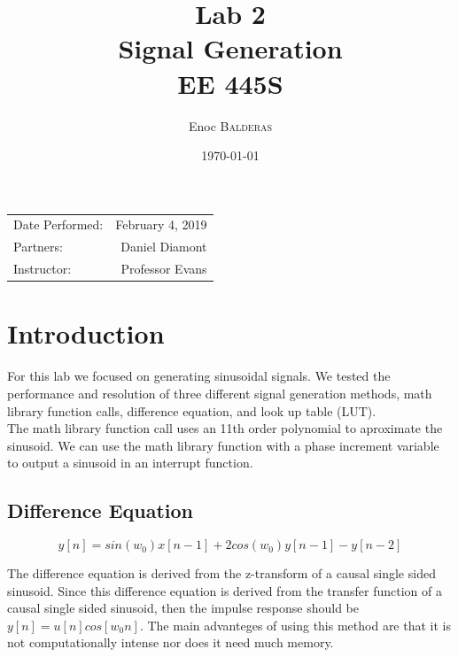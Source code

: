 \documentclass{article}
\title{Lab 2\\ Signal Generation\\ EE 445S} %
\author{Enoc \textsc{Balderas}} %
\date{\today} %
\begin{document}
\maketitle %

\begin{center}
\begin{tabular}{l r}
Date Performed: & February 4, 2019 \\ %
Partners: & Daniel Diamont \\ %
Instructor: & Professor Evans %
\end{tabular}
\end{center}



\section{Introduction}

For this lab we focused on generating sinusoidal signals. 
We tested the performance and resolution of three different signal generation methods, math library function calls, difference equation, and look up table (LUT).\\

The math library function call uses an 11th order polynomial to aproximate the sinusoid.
We can use the math library function with a phase increment variable to output a sinusoid in an interrupt function.

\subsection{Difference Equation}

\begin{equation}
y[n] = sin(w_0)x[n-1] + 2cos(w_0)y[n-1] - y[n-2]
\end{equation}

The difference equation is derived from the z-transform of a causal single sided sinusoid.
Since this difference equation is derived from the transfer function of a causal single sided sinusoid, then the impulse response should be $y[n] = u[n]cos[w_0n]$.
The main advanteges of using this method are that it is not computationally intense nor does it need much memory.
\end{document}
